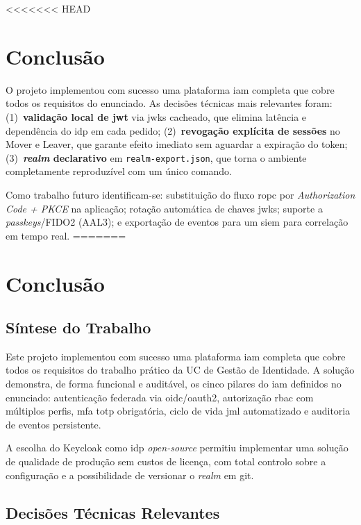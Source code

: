 <<<<<<< HEAD
\chapter{Conclusão}
\label{chap:conclusao}

O projeto implementou com sucesso uma plataforma \gls{iam} completa que cobre todos os requisitos do enunciado. As decisões técnicas mais relevantes foram: (1)~\textbf{validação local de \gls{jwt}} via \gls{jwks} cacheado, que elimina latência e dependência do \gls{idp} em cada pedido; (2)~\textbf{revogação explícita de sessões} no Mover e Leaver, que garante efeito imediato sem aguardar a expiração do token; (3)~\textbf{\textit{realm} declarativo} em \texttt{realm-export.json}, que torna o ambiente completamente reproduzível com um único comando.

Como trabalho futuro identificam-se: substituição do fluxo \gls{ropc} por \textit{Authorization Code + PKCE} na aplicação; rotação automática de chaves \gls{jwks}; suporte a \textit{passkeys}/FIDO2 (AAL3); e exportação de eventos para um \gls{siem} para correlação em tempo real.
=======
\chapter{Conclusão}
\label{chap:conclusao}

\section{Síntese do Trabalho}

Este projeto implementou com sucesso uma plataforma \gls{iam} completa que cobre todos os requisitos do trabalho prático da UC de Gestão de Identidade. A solução demonstra, de forma funcional e auditável, os cinco pilares do \gls{iam} definidos no enunciado: autenticação federada via \gls{oidc}/\gls{oauth2}, autorização \gls{rbac} com múltiplos perfis, \gls{mfa} \gls{totp} obrigatória, ciclo de vida \gls{jml} automatizado e auditoria de eventos persistente.

A escolha do Keycloak como \gls{idp} \textit{open-source} permitiu implementar uma solução de qualidade de produção sem custos de licença, com total controlo sobre a configuração e a possibilidade de versionar o \textit{realm} em git.

\section{Decisões Técnicas Relevantes}

